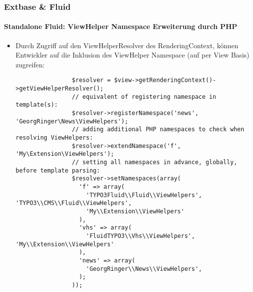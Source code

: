 \begin{frame}[fragile]
	\frametitle{Extbase \& Fluid}
	\framesubtitle{Standalone Fluid: ViewHelper Namespace Erweiterung durch PHP}

	\lstset{basicstyle=\tiny\ttfamily}

	\begin{itemize}

		\item Durch Zugriff auf den ViewHelperResolver des RenderingContext, können Entwickler auf die Inklusion des ViewHelper Namespace (auf per View Basis) zugreifen:

			\begin{lstlisting}
				$resolver = $view->getRenderingContext()->getViewHelperResolver();
				// equivalent of registering namespace in template(s):
				$resolver->registerNamespace('news', 'GeorgRinger\News\ViewHelpers');
				// adding additional PHP namespaces to check when resolving ViewHelpers:
				$resolver->extendNamespace('f', 'My\Extension\ViewHelpers');
				// setting all namespaces in advance, globally, before template parsing:
				$resolver->setNamespaces(array(
				  'f' => array(
				    'TYPO3Fluid\\Fluid\\ViewHelpers', 'TYPO3\\CMS\\Fluid\\ViewHelpers',
				    'My\\Extension\\ViewHelpers'
				  ),
				  'vhs' => array(
				    'FluidTYPO3\\Vhs\\ViewHelpers', 'My\\Extension\\ViewHelpers'
				  ),
				  'news' => array(
				    'GeorgRinger\\News\\ViewHelpers',
				  );
				));
			\end{lstlisting}
	\end{itemize}

\end{frame}


